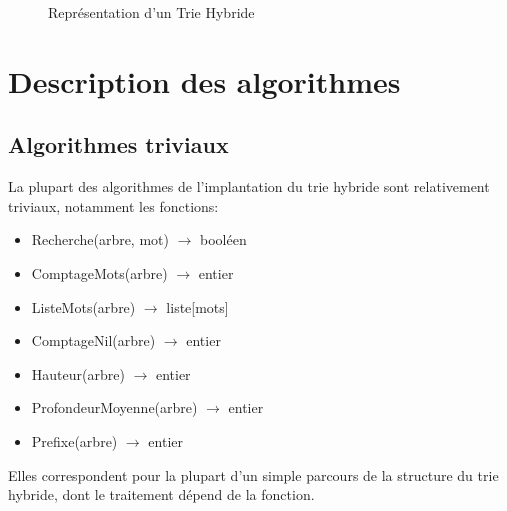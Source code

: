 \documentclass[a4paper,12pt]{report}
\begin{document}
\begin{figure}[!htbp]
\caption{Représentation d'un Trie Hybride}
\end{figure}

\section{Description des algorithmes}
\subsection{Algorithmes triviaux}
La plupart des algorithmes de l'implantation du trie hybride sont relativement triviaux, notamment
les fonctions:
\begin{itemize}
 \item Recherche(arbre, mot) $\rightarrow$ booléen
 \item ComptageMots(arbre) $\rightarrow$ entier
 \item ListeMots(arbre) $\rightarrow$ liste[mots]
 \item ComptageNil(arbre) $\rightarrow$ entier
 \item Hauteur(arbre) $\rightarrow$ entier
 \item ProfondeurMoyenne(arbre) $\rightarrow$ entier
 \item Prefixe(arbre) $\rightarrow$ entier
\end{itemize}
Elles correspondent pour la plupart d'un simple parcours de la structure du trie hybride, dont le traitement
dépend de la fonction.
\end{document}
